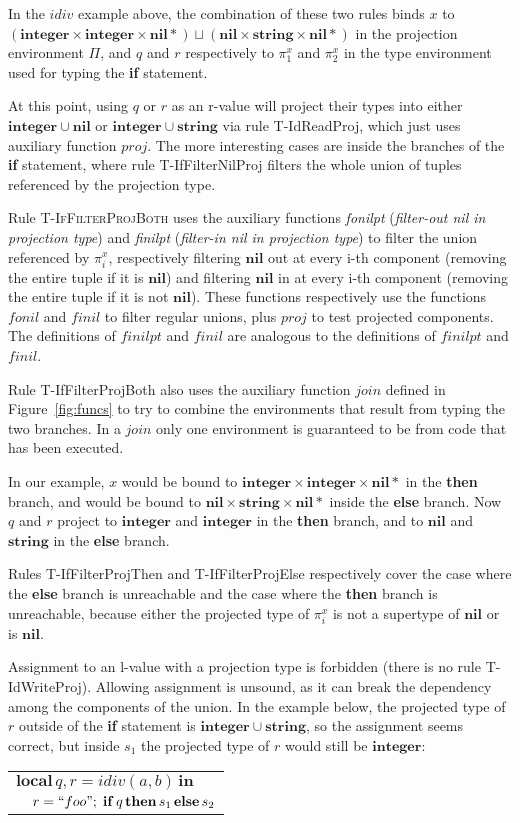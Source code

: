 \documentclass[10pt]{sigplanconf}
\newcommand{\Nil}{\mathbf{nil}}
\newcommand{\Integer}{\mathbf{integer}}
\newcommand{\String}{\mathbf{string}}
\begin{document}
In the $idiv$ example above, the combination of these two rules binds $x$ to
$(\Integer \times \Integer \times \Nil{*}) \sqcup (\Nil \times \String \times \Nil{*})$ in the projection environment $\Pi$,
and $q$ and $r$ respectively to $\pi_{1}^{x}$ and $\pi_{2}^{x}$
in the type environment used for typing the {\bf if} statement.

At this point, using $q$ or $r$ as an r-value will project
their types into either $\Integer \cup \Nil$ or $\Integer \cup \String$ via rule {\sc T-IdReadProj}, which just uses auxiliary function $proj$. The more interesting cases are inside the
branches of the {\bf if} statement, where rule {\sc T-IfFilterNilProj} filters the whole union of tuples referenced
by the projection type.

Rule \textsc{T-IfFilterProjBoth} uses the auxiliary functions \emph{fonilpt} ({\em filter-out nil in projection type}) and \emph{finilpt} ({\em filter-in nil in projection type}) to
filter the union referenced by $\pi_{i}^{x}$, respectively
filtering $\Nil$ out at every i-th component (removing
the entire tuple if it is $\Nil$) and filtering $\Nil$ in at every i-th component (removing the entire tuple if it is not $\Nil$). These functions respectively use the functions $fonil$ and $finil$ to filter regular unions, plus $proj$ to test projected components. The definitions of $finilpt$ and $finil$ are analogous to the definitions of $finilpt$ and $finil$.

Rule {\sc T-IfFilterProjBoth} also uses the auxiliary function $join$ defined in Figure~\ref{fig:funcs} to try to combine the environments that result from typing the two branches. In a $join$ only one environment is guaranteed to be from code that has been executed.

In our example, $x$ would be bound to $\Integer \times \Integer \times \Nil{*}$ in the {\bf then} branch, and would be bound
to $\Nil \times \String \times \Nil{*}$ inside the {\bf else}
branch. Now $q$ and $r$ project to $\Integer$ and $\Integer$
in the {\bf then} branch, and to $\Nil$ and $\String$ in the
{\bf else} branch. 

Rules {\sc T-IfFilterProjThen} and {\sc T-IfFilterProjElse}
respectively cover the case where the {\bf else} branch is unreachable and the case where the {\bf then} branch is unreachable, because either the projected type of $\pi_i^x$
is not a supertype of $\Nil$ or is $\Nil$.

Assignment to an l-value with a projection type is forbidden
(there is no rule {\sc T-IdWriteProj}). Allowing assignment is unsound, as it can break the dependency among the components of the union. In the example below,
the projected type of $r$ outside of the {\bf if} statement
is $\Integer \cup \String$, so the assignment seems correct,
but inside $s_1$ the projected type of $r$ would still be
$\Integer$:
{\small
\begin{center}
	\begin{tabular}{ll}
		\multicolumn{2}{l}{$\mathbf{local} \, q, r = idiv(a, b) \, \mathbf{in}$} \\
		&  $r = ``foo" ;\; \mathbf{if} \, q \, \mathbf{then} \, s_1 \, \mathbf{else} \, s_2$
	\end{tabular}
\end{center}
}
\end{document}
